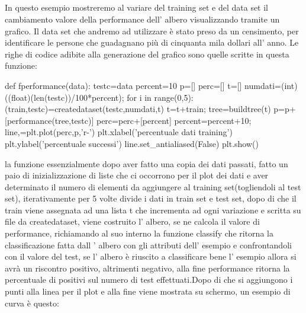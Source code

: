 		\subsection{}
		In questo esempio mostreremo al variare del training set e del data set il cambiamento valore della performance dell' albero visualizzando tramite un grafico.
		\newline
		Il data set che andremo ad utilizzare è stato preso da un censimento, per identificare le persone che guadagnano più di cinquanta mila dollari all' anno.
		Le righe di codice adibite alla generazione del grafico sono quelle scritte in questa funzione:
		\begin{python}
		def fperformance(data):
			testc=data
			percent=10
			p=[]
			perc=[]
			t=[]
			numdati=(int)((float)(len(testc))/100*percent);
			for i in range(0,5):
				(train,testc)=createdataset(testc,numdati,t)
				t=t+train;
				tree=buildtree(t)
				p=p+[performance(tree,testc)]
				perc=perc+[percent]
				percent=percent+10;
				line,=plt.plot(perc,p,'r-')
			plt.xlabel('percentuale dati training')
			plt.ylabel('percentuale successi')
			line.set_antialiased(False)
			plt.show()
		\end{python}
		la funzione essenzialmente dopo aver fatto una copia dei dati passati, fatto un paio di inizializzazione di liste che ci occorrono per il plot dei dati e aver determinato il numero di elementi da aggiungere al training set(togliendoli al test set), iterativamente per 5 volte divide i dati in train set e test set, dopo di che il train viene assegnata ad una lista t che incrementa ad ogni variazione e scritta su file da createdataset, viene costruito l' albero, se ne calcola il valore di performance, richiamando al suo interno la funzione classify che ritorna la classificazione  fatta dall ' albero con gli attributi dell' esempio e confrontandoli con il valore del test, se l' albero è riuscito a classificare bene l' esempio allora si avrà un riscontro positivo, altrimenti negativo, alla fine performance ritorna la percentuale di positivi sul numero di test effettuati.Dopo di che si aggiungono i punti alla linea per il plot e alla fine viene mostrata su schermo, un esempio di curva è questo:
